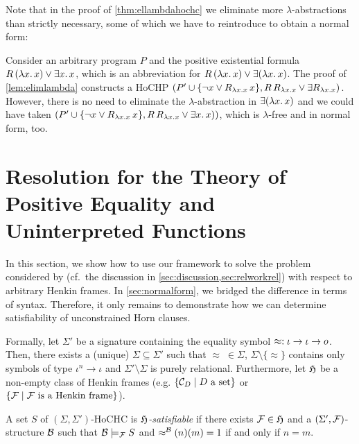 \documentclass[a4paper,twoside,notitlepage,openright,11pt]{report}
\begin{document}
Note that in the proof of \cref{thm:ellambdahochc} we eliminate more $\lambda$-abstractions than strictly necessary, some of which we have to reintroduce to obtain a normal form:
\begin{example}
  Consider an arbitrary program $P$ and the positive existential formula $R\,(\lambda x\ldotp x)\lor\exists x\ldotp x$, which is an abbreviation for $R\,(\lambda x\ldotp x)\lor\exists(\lambda x\ldotp x)$. The proof of \cref{lem:elimlambda} constructs a HoCHP $(P'\cup\{\neg x\lor R_{\lambda x\ldotp x}\,x\},R\,R_{\lambda x\ldotp x}\lor\exists R_{\lambda x\ldotp x})$. However, there is no need to eliminate the $\lambda$-abstraction in $\exists(\lambda x\ldotp x)$ and we could have taken $(P'\cup\{\neg x\lor R_{\lambda x\ldotp x}\,x\},R\,R_{\lambda x\ldotp x}\lor\exists x\ldotp x))$, which is $\lambda$-free and in normal form, too.
\end{example}


\section{Resolution for the Theory of Positive Equality and Uninterpreted Functions}
\label{sec:peuf}
In this section, we show how to use our framework to solve the problem considered by \cite{CHRW13} (cf.\ the discussion in \cref{sec:discussion,sec:relworkrel}) with respect to arbitrary Henkin frames. In \cref{sec:normalform}, we bridged the difference in terms of syntax. Therefore, it only remains to demonstrate how we can determine satisfiability of unconstrained Horn clauses.

Formally, let $\Sigma'$ be a signature containing the equality symbol $\approx:\iota\to\iota\to o$. Then, there exists a (unique) $\Sigma\subseteq\Sigma'$ such that $\approx\;\in\Sigma$, $\Sigma\setminus\{\approx\}$ contains only symbols of type $\iota^n\to\iota$ and $\Sigma'\setminus\Sigma$ is purely relational. Furthermore, let $\mathfrak H$ be a non-empty class of Henkin frames (e.g. $\{\mathcal C_D\mid D\text{ a set}\}$ or $\{\mathcal F\mid\mathcal F\text{ is a Henkin frame}\}$).
\begin{definition}
  A set $S$ of $(\Sigma,\Sigma')$-HoCHC is \emph{$\mathfrak H$-satisfiable} if there exists $\mathcal F\in\mathfrak H$ and a $(\Sigma',\mathcal F)$-structure $\mathcal B$ such that $\mathcal B\models_\mathcal F S$ and $\approx^\mathcal B(n)(m)=1$ if and only if $n=m$.
\end{definition}
\end{document}
